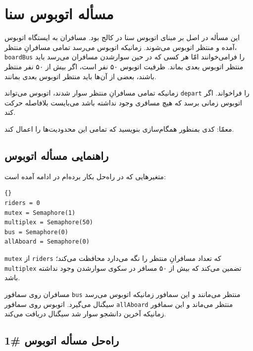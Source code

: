 \documentclass{book}
\newcommand{\clearemptydoublepage}{\newpage\cleardoublepage}
\begin{document}
\section{مسأله اتوبوس سنا\footnotemark}

    این مسأله در اصل بر مبنای اتوبوس سنا در کالج  بود.
    مسافران به ایستگاه اتوبوس آمده و منتظر اتوبوس می‌شوند. زمانیکه اتوبوس می‌رسد تمامی مسافرانِ منتظر، {\tt boardBus} را فرامی‌خوانند امّا 
    هر کسی که در حین سوارشدن مسافران می‌رسد باید منتظر اتوبوس بعدی بماند. ظرفیت اتوبوس ۵۰ نفر است، اگر بیش از ۵۰ نفر منتظر باشند، 
    بعضی از آن‌ها باید منتظر اتوبوس بعدی بمانند. 

    زمانیکه تمامی مسافرانِ منتظر سوار شدند، اتوبوس می‌تواند  {\tt depart} را فراخواند. 
    اگر اتوبوس زمانی برسد که هیچ مسافری وجود نداشته باشد می‌بایست بلافاصله  حرکت کند. 

    معمّا: کدی بمنظور همگام‌سازی بنویسید که تمامی این محدودیت‌ها را اعمال کند. 


\clearemptydoublepage
\subsection {راهنمایی مسأله اتوبوس}

    متغیرهایی که در راه‌حل بکار برده‌ام در ادامه آمده است: 

\begin{latin}
\begin{lstlisting}[title=\rl{راهنمای مسأله اتوبوس}]{}
riders = 0
mutex = Semaphore(1)
multiplex = Semaphore(50)
bus = Semaphore(0)
allAboard = Semaphore(0)
\end{lstlisting}
\end{latin}

    {\tt mutex}
    از  {\tt riders} که تعداد مسافرانِ منتظر را نگه می‌دارد محافظت می‌کند؛ {\tt multiplex} تضمین می‌کند که بیش از ۵۰ مسافر در 
    سکوی  سوارشدن وجود نداشته باشد. 
    

    مسافران روی سمافور {\tt bus} منتظر می‌مانند و این سمافور زمانیکه اتوبوس می‌رسد سیگنال می‌گیرد. 
    اتوبوس روی سمافور {\tt allAboard} منتظر می‌ماند و این سمافور زمانیکه آخرین دانشجو سوار شد سیگنال دریافت می‌کند. 


\clearemptydoublepage
\subsection {راه‌حل مسأله اتوبوس \#1}
\end{document}
